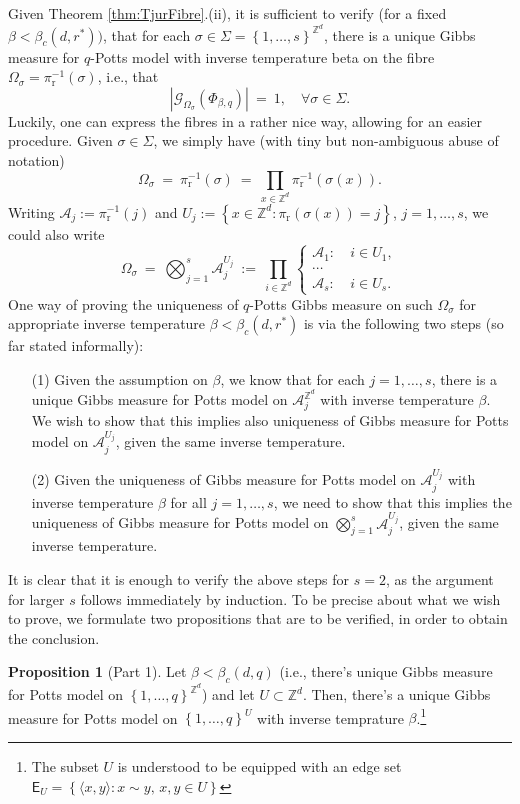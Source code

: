 \documentclass[12pt]{article}
\newcommand{\A}{\mathcal{A}}
\newcommand{\E}{\mathsf{E}}
\newcommand{\G}{\mathcal{G}}
\renewcommand{\r}{\mathrm{r}}
\newcommand{\Z}{\mathbb{Z}}
\newcommand{\set}[1]{\left\{#1\right\}}
\newcommand{\1}{\mathbbm{1}}
\renewcommand{\sp}[1]{\langle #1\rangle}
\newcommand{\5}{\vspace{0.5cm}}
\theoremstyle{definition}
\newtheorem{prop}[thm]{Proposition}
\begin{document}
Given Theorem \ref{thm:TjurFibre}.(ii), it is sufficient to verify (for a fixed $\beta<\beta_c(d,r^*))$, that for each $\sigma\in\Sigma=\set{1,\ldots,s}^{\Z^d}$, there is a unique Gibbs measure for $q$-Potts model with inverse temperature beta on the fibre $\Omega_\sigma=\pi_\r^{-1}(\sigma)$, i.e., that
$$|\G_{\Omega_\sigma}(\Phi_{\beta,q})| ~=~ 1, \quad \forall \sigma\in\Sigma.$$
Luckily, one can express the fibres in a rather nice way, allowing for an easier procedure. Given $\sigma\in\Sigma$, we simply have (with tiny but non-ambiguous abuse of notation)
$$\Omega_\sigma ~=~ \pi_{\r}^{-1}(\sigma) ~=~ \prod_{x\in\Z^d}\pi_{\r}^{-1}(\sigma(x)).$$
Writing $\A_j:=\pi_{\r}^{-1}(j)$ and $U_j:=\set{x\in\Z^d:\pi_{\r}(\sigma(x))=j}$, $j=1,\ldots,s$, we could also write
$$\Omega_\sigma ~=~ \bigotimes_{j=1}^s\A_j^{U_j} ~:=~ \prod_{i\in\Z^d}\begin{cases}\A_1:~&i\in U_1,\\
\cdots\\
\A_s:~&i\in U_s.\end{cases}$$
One way of proving the uniqueness of $q$-Potts Gibbs measure on such $\Omega_\sigma$ for appropriate inverse temperature $\beta<\beta_c(d,r^*)$ is via the following two steps (so far stated informally):
\begin{itemize}
	\item[(1)] Given the assumption on $\beta$, we know that for each $j=1,\ldots,s$, there is a unique Gibbs measure for Potts model on $\A_j^{\Z^d}$ with inverse temperature $\beta$. We wish to show that this implies also uniqueness of Gibbs measure for Potts model on $\A_j^{U_j}$, given the same inverse temperature.
	\item[(2)] Given the uniqueness of Gibbs measure for Potts model on $\A_j^{U_j}$ with inverse temperature $\beta$ for all $j=1,\ldots,s$, we need to show that this implies the uniqueness of Gibbs measure for Potts model on $\bigotimes_{j=1}^s \A_j^{U_j}$, given the same inverse temperature.
\end{itemize}
It is clear that it is enough to verify the above steps for $s=2$, as the argument for larger $s$ follows immediately by induction. To be precise about what we wish to prove, we formulate two propositions that are to be verified, in order to obtain the conclusion.

\begin{prop}[Part 1]\label{FP:part1}
Let $\beta<\beta_c(d,q)$ (i.e., there's unique Gibbs measure for Potts model on $\set{1,\ldots,q}^{\Z^d}$) and let $U\subset\Z^d$. Then, there's a unique Gibbs measure for Potts model on $\set{1,\ldots,q}^U$ with inverse temprature $\beta$.\footnote{The subset $U$ is understood to be equipped with an edge set $\E_U=\set{\sp{x,y}:x\sim y,\,x,y\in U}$}
\end{prop}
\end{document}
